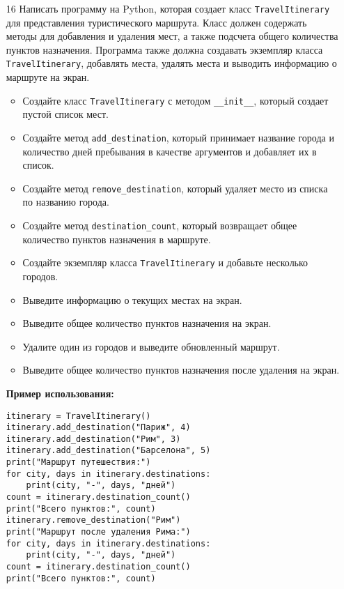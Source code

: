 \begin{enumerate}
\item[16] Написать программу на Python, которая создает класс \texttt{TravelItinerary} для представления туристического маршрута. Класс должен содержать методы для добавления и удаления мест, а также подсчета общего количества пунктов назначения. Программа также должна создавать экземпляр класса \texttt{TravelItinerary}, добавлять места, удалять места и выводить информацию о маршруте на экран.

\begin{itemize}
    \item Создайте класс \texttt{TravelItinerary} с методом \texttt{\_\_init\_\_}, который создает пустой список мест.
    \item Создайте метод \texttt{add\_destination}, который принимает название города и количество дней пребывания в качестве аргументов и добавляет их в список.
    \item Создайте метод \texttt{remove\_destination}, который удаляет место из списка по названию города.
    \item Создайте метод \texttt{destination\_count}, который возвращает общее количество пунктов назначения в маршруте.
    \item Создайте экземпляр класса \texttt{TravelItinerary} и добавьте несколько городов.
    \item Выведите информацию о текущих местах на экран.
    \item Выведите общее количество пунктов назначения на экран.
    \item Удалите один из городов и выведите обновленный маршрут.
    \item Выведите общее количество пунктов назначения после удаления на экран.
\end{itemize}

\textbf{Пример использования:}

\begin{verbatim}
itinerary = TravelItinerary()
itinerary.add_destination("Париж", 4)
itinerary.add_destination("Рим", 3)
itinerary.add_destination("Барселона", 5)
print("Маршрут путешествия:")
for city, days in itinerary.destinations:
    print(city, "-", days, "дней")
count = itinerary.destination_count()
print("Всего пунктов:", count)
itinerary.remove_destination("Рим")
print("Маршрут после удаления Рима:")
for city, days in itinerary.destinations:
    print(city, "-", days, "дней")
count = itinerary.destination_count()
print("Всего пунктов:", count)
\end{verbatim}


\end{enumerate}
